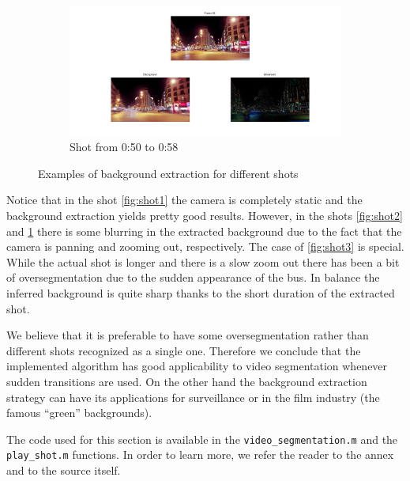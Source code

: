 \begin{figure}[htb]
	\begin{subfigure}[t]{0.65\textwidth}
		\includegraphics[width=\textwidth]{./img/ex1/shot4.png}
		\caption{Shot from 0:50 to 0:58}
		\label{fig:shot4}
	\end{subfigure}
	
\caption{Examples of background extraction for different shots}
\label{fig:background-subtraction}
\end{figure}

Notice that in the shot \ref{fig:shot1} the camera is completely static and the background extraction yields pretty good results. However, in the shots \ref{fig:shot2} and \ref{fig:shot4} there is some blurring in the extracted background due to the fact that the camera is panning and zooming out, respectively. The case of \ref{fig:shot3} is special. While the actual shot is longer and there is a slow zoom out there has been a bit of oversegmentation due to the sudden appearance of the bus. In balance the inferred background is quite sharp thanks to the short duration of the extracted shot.

We believe that it is preferable to have some oversegmentation rather than different shots recognized as a single one. Therefore we conclude that the implemented algorithm has good applicability to video segmentation whenever sudden transitions are used. On the other hand the background extraction strategy can have its applications for surveillance or in the film industry (the famous ``green'' backgrounds).

The code used for this section is available in the \texttt{video\_segmentation.m} and the \texttt{play\_shot.m} functions. In order to learn more, we refer the reader to the annex and to the source itself.

\FloatBarrier
